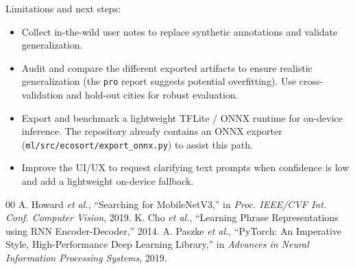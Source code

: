 \documentclass[conference]{IEEEtran}
\begin{document}
Limitations and next steps:
\begin{itemize}
	\item Collect in-the-wild user notes to replace synthetic annotations and validate generalization.
	\item Audit and compare the different exported artifacts to ensure realistic generalization (the \texttt{pro} report suggests potential overfitting). Use cross-validation and hold-out cities for robust evaluation.
	\item Export and benchmark a lightweight TFLite / ONNX runtime for on-device inference. The repository already contains an ONNX exporter (\texttt{ml/src/ecosort/export\_onnx.py}) to assist this path.
	\item Improve the UI/UX to request clarifying text prompts when confidence is low and add a lightweight on-device fallback.
\end{itemize}

\begin{thebibliography}{00}
 A. Howard \textit{et al.}, ``Searching for MobileNetV3,'' in \textit{Proc. IEEE/CVF Int. Conf. Computer Vision}, 2019.
 K. Cho \textit{et al.}, ``Learning Phrase Representations using RNN Encoder-Decoder,'' 2014.
 A. Paszke \textit{et al.}, ``PyTorch: An Imperative Style, High-Performance Deep Learning Library,'' in \textit{Advances in Neural Information Processing Systems}, 2019.
\end{thebibliography}
\end{document}
